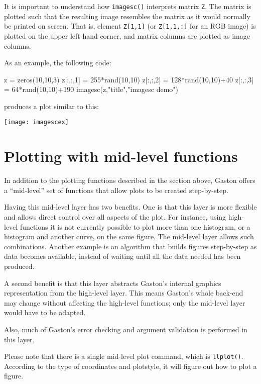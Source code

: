 \documentclass[11pt]{article}
\newcommand{\cmd}[1]{\texttt{#1}}
\begin{document}
It is important to understand how \cmd{imagesc()} interprets matrix \cmd{Z}.
The matrix is plotted such that the resulting image resembles the matrix as it
would normally be printed on screen. That is, element \cmd{Z[1,1]} (or
\cmd{Z[1,1,:]} for an RGB image) is plotted on the upper left-hand corner, and
matrix columns are plotted as image columns.

As an example, the following code:

\begin{juliacode}
z = zeros(10,10,3)
z[:,:,1] = 255*rand(10,10)
z[:,:,2] = 128*rand(10,10)+40
z[:,:,3] = 64*rand(10,10)+190
imagesc(z,"title","imagesc demo")
\end{juliacode}

produces a plot similar to this:

\begin{center}
	\texttt{[image: imagescex]}
\end{center}

\section{Plotting with mid-level functions}
\label{midlevel}

In addition to the plotting functions described in the section above, Gaston
offers a ``mid-level'' set of functions that allow plots to be created
step-by-step.

Having this mid-level layer has two benefits. One is that this layer is more
flexible and allows direct control over all aspects of the plot. For instance,
using high-level functions it is not currently possible to plot more than one
histogram, or a histogram and another curve, on the same figure. The mid-level
layer allows such combinations. Another example is an algorithm that builds
figures step-by-step as data becomes available, instead of waiting until all
the data needed has been produced.

A second benefit is that this layer abstracts Gaston's internal graphics
representation from the high-level layer. This means Gaston's whole back-end
may change without affecting the high-level functions; only the mid-level layer
would have to be adapted.

Also, much of Gaston's error checking and argument validation is performed in
this layer.

Please note that there is a single mid-level plot command, which is
\cmd{llplot()}. According to the type of coordinates and plotstyle, it will
figure out how to plot a figure.
\end{document}
